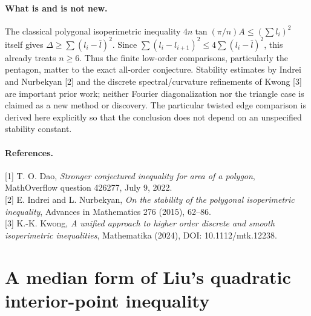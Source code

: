 \documentclass[11pt,a4paper]{article}
\numberwithin{equation}{section}
\theoremstyle{definition}
\theoremstyle{remark}
\begin{document}
\paragraph{What is and is not new.}
The classical polygonal isoperimetric inequality $4n\tan(\pi/n)A\le(\sum l_i)^2$ itself gives $\Delta\ge\sum(l_i-\bar l)^2$. Since $\sum(l_i-l_{i+1})^2\le4\sum(l_i-\bar l)^2$, this already treats $n\ge6$. Thus the finite low-order comparisons, particularly the pentagon, matter to the exact all-order conjecture. Stability estimates by Indrei and Nurbekyan [2] and the discrete spectral/curvature refinements of Kwong [3] are important prior work; neither Fourier diagonalization nor the triangle case is claimed as a new method or discovery. The particular twisted edge comparison is derived here explicitly so that the conclusion does not depend on an unspecified stability constant.

\paragraph{References.}
[1] T. O. Dao, \emph{Stronger conjectured inequality for area of a polygon}, MathOverflow question 426277, July 9, 2022.\\
{}[2] E. Indrei and L. Nurbekyan, \emph{On the stability of the polygonal isoperimetric inequality}, Advances in Mathematics 276 (2015), 62--86.\\
{}[3] K.-K. Kwong, \emph{A unified approach to higher order discrete and smooth isoperimetric inequalities}, Mathematika (2024), DOI: 10.1112/mtk.12238.

\par\endgroup

\begingroup
\newcommand{\cy}{\sum_{\rm cyc}}
\section{\texorpdfstring{A median form of Liu's quadratic interior-point inequality}{A median form of Liu's quadratic interior-point inequality}}\label{section:r45keio}
\par\medskip
\end{document}
